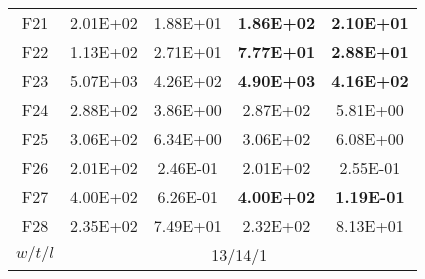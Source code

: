 \begin{table*}[!ht]
\begin{tabular}{|c|cc|cc|}
    \hline
    F21   & 2.01E+02 & 1.88E+01 & \textbf{1.86E+02} & \textbf{2.10E+01} \\
    F22   & 1.13E+02 & 2.71E+01 & \textbf{7.77E+01} & \textbf{2.88E+01} \\
    F23   & 5.07E+03 & 4.26E+02 & \textbf{4.90E+03} & \textbf{4.16E+02} \\
    F24   & 2.88E+02 & 3.86E+00 & 2.87E+02 & 5.81E+00 \\
    F25   & 3.06E+02 & 6.34E+00 & 3.06E+02 & 6.08E+00 \\
    F26   & 2.01E+02 & 2.46E-01 & 2.01E+02 & 2.55E-01 \\
    F27   & 4.00E+02 & 6.26E-01 & \textbf{4.00E+02} & \textbf{1.19E-01} \\
    F28   & 2.35E+02 & 7.49E+01 & 2.32E+02 & 8.13E+01 \\
    \hline
    $w/t/l$ & \multicolumn{4}{c|}{13/14/1} \\
    \hline
    \end{tabular}%
  \label{tab:AG_behavior_limit}%
\end{table*}%

